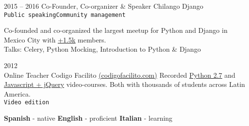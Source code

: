 \documentclass[9pt]{developercv} %
\begin{document}
\begin{entrylist}
    \entry
        {2015 -- 2016}
        {Co-Founder, Co-organizer \& Speaker}
        {
            Chilango Django \\
            \texttt{Public speaking}\slashsep\texttt{Community management}
        }
        {
            
            Co-founded and co-organized the largest meetup for Python and Django in 
            Mexico City with {\href{https://meetup.com/Chilango-Django/}{\underline{+1.5k}}} members. \\

            \small{Talks: Celery, Python Mocking, Introduction to Python \& Django}
            
        }
    \entry
        {2012\\\footnotesize{Online}}
        {Teacher}
        {Codigo Facilito {\href{(https://codigofacilito.com/}{(codigofacilito.com)}}}
        {
            Recorded 
            {\href{https://www.youtube.com/watch?v=CjmzDHMHxwU&list=PLE549A038CF82905F}{\underline{Python 2.7}}} 
            and {\href{https://www.youtube.com/watch?v=jKbjblt4NXA&list=PLpOqH6AE0tNi47LF-_6gddgq10lp_TLDB}{\underline{Javascript + jQuery}}} 
            video-courses. Both with thousands of students across Latin America.\\
            \texttt{Video edition}
        }
\end{entrylist}


\begin{minipage}[t]{1\textwidth}
    \vspace{-\baselineskip} %
    \textbf{Spanish} - native
    \slashsep\textbf{English} - proficient
    \slashsep\textbf{Italian} - learning
\end{minipage}
\end{document}
